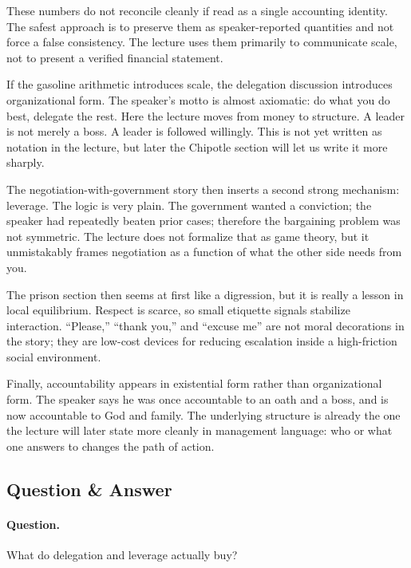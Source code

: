 \begin{remark}
These numbers do not reconcile cleanly if read as a single accounting identity. The safest approach is to preserve them as speaker-reported quantities and not force a false consistency. The lecture uses them primarily to communicate scale, not to present a verified financial statement.
\end{remark}

If the gasoline arithmetic introduces scale, the delegation discussion introduces organizational form. The speaker's motto is almost axiomatic: do what you do best, delegate the rest. Here the lecture moves from money to structure. A leader is not merely a boss. A leader is followed willingly. This is not yet written as notation in the lecture, but later the Chipotle section will let us write it more sharply.

The negotiation-with-government story then inserts a second strong mechanism: leverage. The logic is very plain. The government wanted a conviction; the speaker had repeatedly beaten prior cases; therefore the bargaining problem was not symmetric. The lecture does not formalize that as game theory, but it unmistakably frames negotiation as a function of what the other side needs from you.

The prison section then seems at first like a digression, but it is really a lesson in local equilibrium. Respect is scarce, so small etiquette signals stabilize interaction. ``Please,'' ``thank you,'' and ``excuse me'' are not moral decorations in the story; they are low-cost devices for reducing escalation inside a high-friction social environment.

Finally, accountability appears in existential form rather than organizational form. The speaker says he was once accountable to an oath and a boss, and is now accountable to God and family. The underlying structure is already the one the lecture will later state more cleanly in management language: who or what one answers to changes the path of action.

\subsection{Question \& Answer}

\paragraph{Question.} What do delegation and leverage actually buy?

